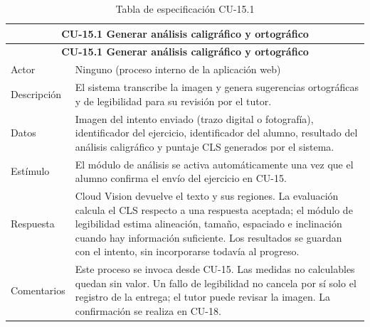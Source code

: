 \begin{longtable}{|p{4cm}|p{11cm}|}
\caption{Tabla de especificación CU-15.1}
\label{tab:cu15_1} \\
\hline
\multicolumn{2}{|c|}{\textbf{CU-15.1 Generar análisis caligráfico y ortográfico}} \\
\hline
\endfirsthead
\hline
\multicolumn{2}{|c|}{\textbf{CU-15.1 Generar análisis caligráfico y ortográfico}} \\
\hline
\endhead
\hline
\endfoot
\endlastfoot
Actor & Ninguno (proceso interno de la aplicación web) \\
\hline
Descripción & El sistema transcribe la imagen y genera sugerencias ortográficas y de legibilidad para su revisión por el tutor. \\
\hline
Datos & Imagen del intento enviado (trazo digital o fotografía), identificador del ejercicio, identificador del alumno, resultado del análisis caligráfico y puntaje CLS generados por el sistema. \\
\hline
Estímulo & El módulo de análisis se activa automáticamente una vez que el alumno confirma el envío del ejercicio en CU-15. \\
\hline
Respuesta & Cloud Vision devuelve el texto y sus regiones. La evaluación calcula el CLS respecto a una respuesta aceptada; el módulo de legibilidad estima alineación, tamaño, espaciado e inclinación cuando hay información suficiente. Los resultados se guardan con el intento, sin incorporarse todavía al progreso. \\
\hline
Comentarios & Este proceso se invoca desde CU-15. Las medidas no calculables quedan sin valor. Un fallo de legibilidad no cancela por sí solo el registro de la entrega; el tutor puede revisar la imagen. La confirmación se realiza en CU-18. \\
\hline
\end{longtable}

